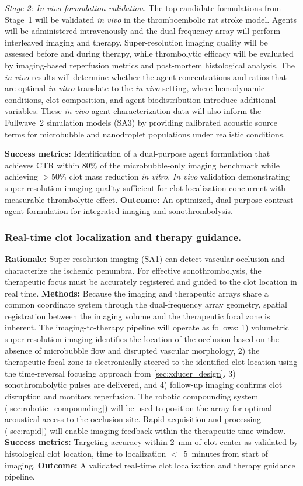 \textit{Stage 2: In vivo formulation validation.} The top candidate formulations from Stage~1 will be validated \textit{in vivo} in the thromboembolic rat stroke model. Agents will be administered intravenously and the dual-frequency array will perform interleaved imaging and therapy. Super-resolution imaging quality will be assessed before and during therapy, while thrombolytic efficacy will be evaluated by imaging-based reperfusion metrics and post-mortem histological analysis. The \textit{in vivo} results will determine whether the agent concentrations and ratios that are optimal \textit{in vitro} translate to the \textit{in vivo} setting, where hemodynamic conditions, clot composition, and agent biodistribution introduce additional variables. These \textit{in vivo} agent characterization data will also inform the Fullwave~2 simulation models (SA3) by providing calibrated acoustic source terms for microbubble and nanodroplet populations under realistic conditions.

\textbf{Success metrics:} Identification of a dual-purpose agent formulation that achieves CTR within 80\% of the microbubble-only imaging benchmark while achieving $>$50\% clot mass reduction \textit{in vitro}. \textit{In vivo} validation demonstrating super-resolution imaging quality sufficient for clot localization concurrent with measurable thrombolytic effect. \textbf{Outcome:} An optimized, dual-purpose contrast agent formulation for integrated imaging and sonothrombolysis.

\subsubsection{Real-time clot localization and therapy guidance.\label{sec:clot_targeting}}
\textbf{Rationale:} Super-resolution imaging (SA1) can detect vascular occlusion and characterize the ischemic penumbra. For effective sonothrombolysis, the therapeutic focus must be accurately registered and guided to the clot location in real time. \textbf{Methods:} Because the imaging and therapeutic arrays share a common coordinate system through the dual-frequency array geometry, spatial registration between the imaging volume and the therapeutic focal zone is inherent. The imaging-to-therapy pipeline will operate as follows: 1) volumetric super-resolution imaging identifies the location of the occlusion based on the absence of microbubble flow and disrupted vascular morphology, 2) the therapeutic focal zone is electronically steered to the identified clot location using the time-reversal focusing approach from \ref{sec:xducer_design}, 3) sonothrombolytic pulses are delivered, and 4) follow-up imaging confirms clot disruption and monitors reperfusion. The robotic compounding system (\ref{sec:robotic_compounding}) will be used to position the array for optimal acoustical access to the occlusion site. Rapid acquisition and processing (\ref{sec:rapid}) will enable imaging feedback within the therapeutic time window. \textbf{Success metrics:} Targeting accuracy within 2~mm of clot center as validated by histological clot location, time to localization $<$~5~minutes from start of imaging. \textbf{Outcome:} A validated real-time clot localization and therapy guidance pipeline.


